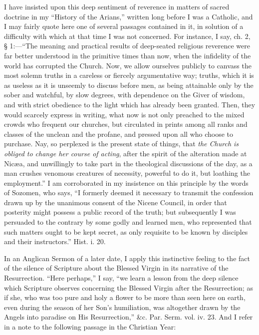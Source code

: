 I have insisted upon this deep sentiment of
reverence in matters of sacred doctrine in my ``History of the
Arians,''
written long before I was a Catholic, and I may fairly quote here one
of several passages contained in it, in solution of a difficulty with
which at that time I was not concerned. For instance, I say, ch. 2, §
1:—``The meaning and practical results of deep-seated religious
reverence were far better understood in the primitive times than now,
when the infidelity of the world has corrupted the Church. Now, we
allow ourselves publicly to canvass the most solemn truths in a
careless or fiercely argumentative way; truths, which it is as useless
as it is unseemly to discuss before men, as being attainable only by
the sober and watchful, by slow degrees, with dependence on the Giver
of wisdom, and with strict obedience to the light which has already
been granted. Then, they would scarcely express in writing, what now
is not only preached to the mixed crowds who frequent our
churches, but circulated in prints among all ranks and classes of the
unclean and the profane, and pressed upon all who choose to purchase.
Nay, so perplexed is the present state of things, that \emph{the Church
is obliged to change her course of acting}, after the spirit of the
alteration made at Nicæa, and unwillingly to take part in the
theological discussions of the day, as a man crushes venomous
creatures of necessity, powerful to do it, but loathing the
employment.'' I am corroborated in my insistence on this principle by
the words of Sozomen, who says, ``I formerly deemed it necessary to
transmit the confession drawn up by the unanimous consent of the
Nicene Council, in order that posterity might possess a public record
of the truth; but subsequently I was persuaded to the contrary by some
godly and learned men, who represented that such matters ought to be
kept secret, as only requisite to be known by disciples and their
instructors.'' Hist. i. 20.

In an Anglican Sermon of a later date, I apply
this instinctive feeling to the fact of the silence of Scripture about
the Blessed Virgin in its narrative of the Resurrection. ``Here
perhaps,'' I say, ``we learn a lesson from the deep silence which
Scripture observes concerning the Blessed Virgin after the
Resurrection; as if she, who was too pure and holy a flower to be more
than seen here on earth, even during the season of her Son's
humiliation, was altogether drawn by the Angels into paradise on His
Resurrection,'' \&c. Par.
Serm. vol. iv. 23. And I refer in a note
to the following passage in the Christian Year:

